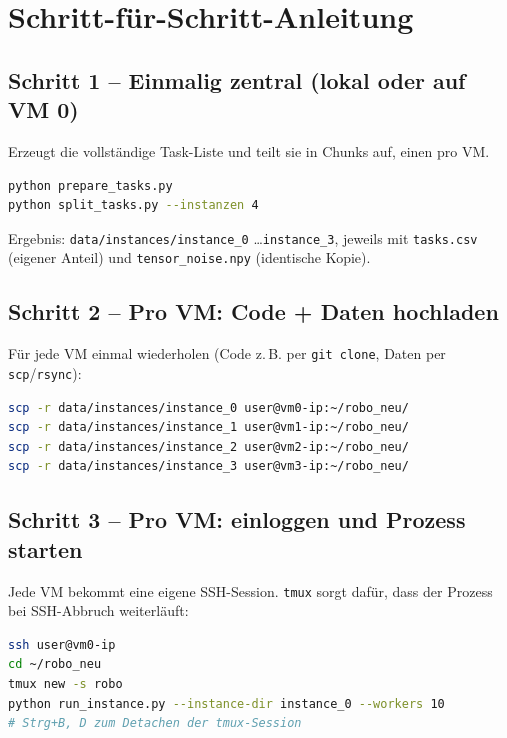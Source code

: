 \documentclass[11pt,a4paper]{article}
\begin{document}
\section{Schritt-f\"ur-Schritt-Anleitung}

\subsection{Schritt 1 -- Einmalig zentral (lokal oder auf VM 0)}

Erzeugt die vollst\"andige Task-Liste und teilt sie in Chunks auf, einen pro VM.

\begin{lstlisting}[language=bash]
python prepare_tasks.py
python split_tasks.py --instanzen 4
\end{lstlisting}

Ergebnis: \texttt{data/instances/instance\_0} \dots \texttt{instance\_3}, jeweils mit
\texttt{tasks.csv} (eigener Anteil) und \texttt{tensor\_noise.npy} (identische Kopie).

\subsection{Schritt 2 -- Pro VM: Code + Daten hochladen}

F\"ur jede VM einmal wiederholen (Code z.\,B. per \texttt{git clone}, Daten per
\texttt{scp}/\texttt{rsync}):

\begin{lstlisting}[language=bash]
scp -r data/instances/instance_0 user@vm0-ip:~/robo_neu/
scp -r data/instances/instance_1 user@vm1-ip:~/robo_neu/
scp -r data/instances/instance_2 user@vm2-ip:~/robo_neu/
scp -r data/instances/instance_3 user@vm3-ip:~/robo_neu/
\end{lstlisting}

\subsection{Schritt 3 -- Pro VM: einloggen und Prozess starten}

Jede VM bekommt eine eigene SSH-Session. \texttt{tmux} sorgt daf\"ur, dass der Prozess
bei SSH-Abbruch weiterl\"auft:

\begin{lstlisting}[language=bash]
ssh user@vm0-ip
cd ~/robo_neu
tmux new -s robo
python run_instance.py --instance-dir instance_0 --workers 10
# Strg+B, D zum Detachen der tmux-Session
\end{lstlisting}
\end{document}
